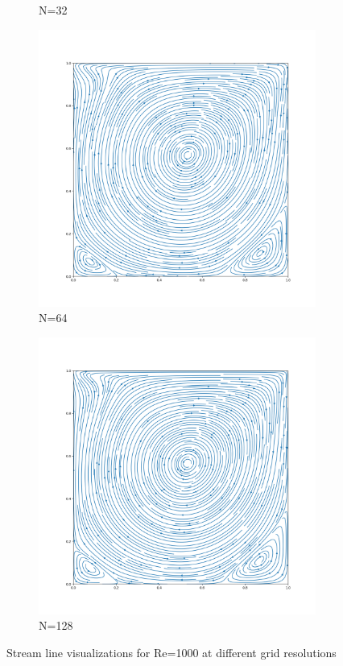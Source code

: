 \documentclass[12pt]{article}
\begin{document}
\begin{figure}[H]
\begin{subfigure}[b]{0.48\linewidth}
        \caption{N=32}
    \end{subfigure}
    
    \begin{subfigure}[b]{0.48\linewidth}
        \includegraphics[width=\linewidth]{figures/Re=1000_result/Re1000_streamline_64.png}
        \caption{N=64}
    \end{subfigure}
    \hspace{-5mm} %
    \begin{subfigure}[b]{0.48\linewidth}
        \includegraphics[width=\linewidth]{figures/Re=1000_result/Re1000_streamline_128.png}
        \caption{N=128}
    \end{subfigure}
    \caption{Stream line visualizations for Re=1000 at different grid resolutions}
\end{figure}
\end{document}
